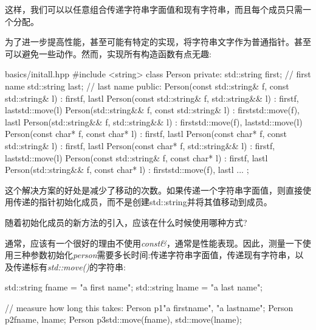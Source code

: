 这样，我们可以以任意组合传递字符串字面值和现有字符串，而且每个成员只需一个分配。\par


为了进一步提高性能，甚至可能有特定的实现，将字符串文字作为普通指针。甚至可以避免一些动作。然而，实现所有构造函数有点无趣:\par

\begin{codeboxt}[cpp]{basics/initall.hpp}
#include <string>
class Person {
  private:
  std::string first; // first name
  std::string last; // last name
  public:
  Person(const std::string& f, const std::string& l)
  : first{f}, last{l} {
  }
  Person(const std::string& f, std::string&& l)
  : first{f}, last{std::move(l)} {
  }
  Person(std::string&& f, const std::string& l)
  : first{std::move(f)}, last{l} {
  }
  Person(std::string&& f, std::string&& l)
  : first{std::move(f)}, last{std::move(l)} {
  }
  Person(const char* f, const char* l)
  : first{f}, last{l} {
  }
  Person(const char* f, const std::string& l)
  : first{f}, last{l} {
  }
  Person(const char* f, std::string&& l)
  : first{f}, last{std::move(l)} {
  }
  Person(const std::string& f, const char* l)
  : first{f}, last{l} {
  }
  Person(std::string&& f, const char* l)
  : first{std::move(f)}, last{l} {
  }
  ...
};
\end{codeboxt}

这个解决方案的好处是减少了移动的次数。如果传递一个字符串字面值，则直接使用传递的指针初始化成员，而不是创建std::string并将其值移动到成员。\par


随着初始化成员的新方法的引入，应该在什么时候使用哪种方式?\par

通常，应该有一个很好的理由不使用\textit{const\&}，通常是性能表现。因此，测量一下使用三种参数初始化\textit{person}需要多长时间:传递字符串字面值，传递现有字符串，以及传递标有\textit{std::move()}的字符串:\par

\begin{codebox}[cpp]
std::string fname = "a first name";
std::string lname = "a last name";

// measure how long this takes:
Person p1{"a firstname", "a lastname"};
Person p2{fname, lname};
Person p3{std::move(fname), std::move(lname)};
\end{codebox}

